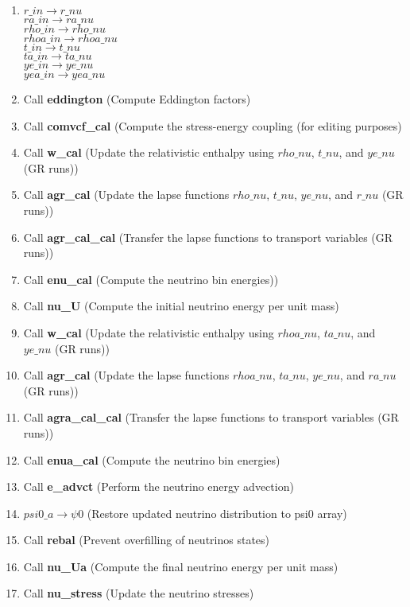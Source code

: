\documentclass[11pt,doublespace]{article}
\begin{document}
\begin{itemize}
\begin{enumerate}
\begin{enumerate}
\begin{enumerate}
  \item $r\_in \rightarrow r\_nu$\\
            $ra\_in \rightarrow ra\_nu$\\
            $rho\_in \rightarrow rho\_nu$\\
            $rhoa\_in \rightarrow rhoa\_nu$\\
            $t\_in \rightarrow t\_nu$\\
            $ta\_in \rightarrow ta\_nu$\\
            $ye\_in \rightarrow ye\_nu$\\
            $yea\_in \rightarrow yea\_nu$
  \item Call {\bf eddington} (Compute Eddington factors)
  \item Call {\bf comvcf\_cal} (Compute the stress-energy coupling (for editing purposes)
  \item Call {\bf w\_cal} (Update the relativistic enthalpy using $rho\_nu$, $t\_nu$, and $ye\_nu$  (GR runs))
  \item Call {\bf agr\_cal} (Update the lapse functions $rho\_nu$, $t\_nu$, $ye\_nu$, and $r\_nu$ (GR runs))
  \item Call {\bf agr\_cal\_cal} (Transfer the lapse functions to transport variables (GR runs))
  \item Call {\bf enu\_cal} (Compute the neutrino bin energies))
  \item Call {\bf nu\_U} (Compute the initial neutrino energy per unit mass)
  \item Call {\bf w\_cal} (Update the relativistic enthalpy using $rhoa\_nu$, $ta\_nu$, and $ye\_nu$  (GR runs))
  \item Call {\bf agr\_cal} (Update the lapse functions $rhoa\_nu$, $ta\_nu$, $ye\_nu$, and $ra\_nu$ (GR runs))
  \item Call {\bf agra\_cal\_cal} (Transfer the lapse functions to transport variables (GR runs))
  \item Call {\bf enua\_cal} (Compute the neutrino bin energies)
  \item Call {\bf e\_advct} (Perform the neutrino energy advection)
  \item $psi0\_a \rightarrow \psi0$ (Restore updated neutrino distribution to psi0 array)
  \item Call {\bf rebal} (Prevent overfilling of neutrinos states)
  \item Call {\bf nu\_Ua} (Compute the final neutrino energy per unit mass)
  \item Call {\bf nu\_stress} (Update the neutrino stresses)

\end{enumerate}
\end{enumerate}
\end{enumerate}
\end{itemize}
\end{document}
